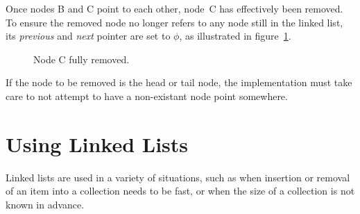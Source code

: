 \documentclass{article}
\begin{document}
  Once nodes B and C point to each other, node~C has effectively been removed. To ensure the removed node no longer refers to any node still in the linked list, its \emph{previous} and \emph{next} pointer are set to $\phi$, as illustrated in figure~\ref{fig:doublelinkedlist-after-remove}.
  \begin{figure}[H]
    \centering
    \caption{Node C fully removed.}
    \label{fig:doublelinkedlist-after-remove}
  \end{figure}

  If the node to be removed is the head or tail node, the implementation must take care to not attempt to have a non-existant node point somewhere.

  \section{Using Linked Lists}\label{sect:usage}
  Linked lists are used in a variety of situations, such as when insertion or removal of an item into a collection needs to be fast, or when the size of a collection is not known in advance.
\end{document}
